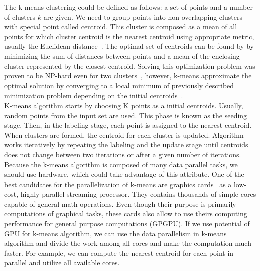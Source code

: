 The k-means clustering could be defined as follows: a set of points and a number of clusters $k$ are given. We need to group points into non-overlapping clusters with special point called centroid. This cluster is composed as a mean of all points for which cluster centroid is the nearest centroid using appropriate metric, usually the Euclidean distance~\cite{Zechner09}. The optimal set of centroids can be found by by minimizing the sum of distances between points and a mean of the enclosing cluster represented by the closest centroid. Solving this optimization problem was proven to be NP-hard even for two clusters~\cite{Drineas04}, however, k-means approximate the optimal solution by converging to a local minimum of previously described minimization problem depending on the initial centroids~\cite{Bottou95}.\\

K-means algorithm starts by choosing K points as a initial centroids. Usually, random points from the input set are used. This phase is known as the seeding stage.
Then, in the labeling stage, each point is assigned to the nearest centroid.
When clusters are formed, the centroid for each cluster is updated.
Algorithm works iteratively by repeating the labeling and the update stage until centroids does not change between two iterations or after a given number of iterations.\\

Because the k-means algorithm is composed of many data parallel tasks, we should use hardware, which could take advantage of this attribute.
One of the best candidates for the parallelization of k-means are graphics cards~\cite{Zechner09} as a low-cost, highly parallel streaming processor. They contains thousands of simple cores capable of general math operations. Even though their purpose is primarily computations of graphical tasks, these cards also allow to use theirs computing performance for general purpose computations (GPGPU).
If we use potential of GPU for k-means algorithm, we can use the data parallelism in k-means algorithm and divide the work among all cores and make the computation much faster. For example, we can compute the nearest centroid for each point in parallel and utilize all available cores.\\
 

